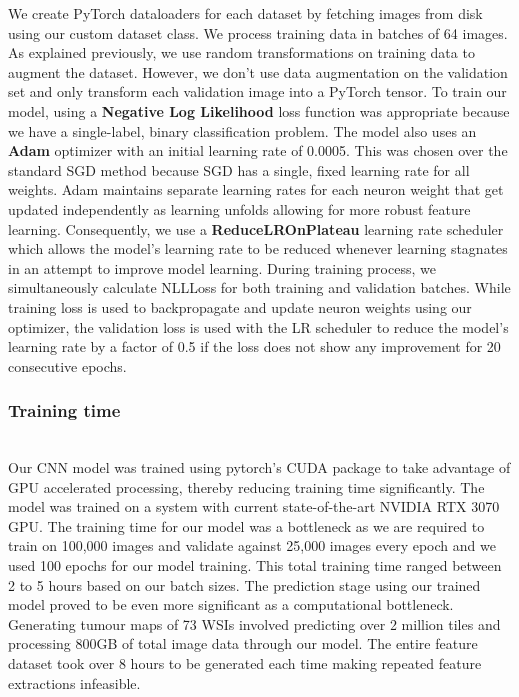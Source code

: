 \documentclass{l4proj}
\begin{document}
We create PyTorch dataloaders for each dataset by fetching images from disk using our custom dataset class. We process training data in batches of 64 images. As explained previously, we use random transformations on training data to augment the dataset. However, we don't use data augmentation on the validation set and only transform each validation image into a PyTorch tensor. To train our model, using a \textbf{Negative Log Likelihood} loss function was appropriate because we have a single-label, binary classification problem. The model also uses an \textbf{Adam} optimizer with an initial learning rate of 0.0005. This was chosen over the standard SGD method because SGD has a single, fixed learning rate for all weights. Adam maintains separate learning rates for each neuron weight that get updated independently as learning unfolds allowing for more robust feature learning. Consequently, we use a \textbf{ReduceLROnPlateau} learning rate scheduler which allows the model's learning rate to be reduced whenever learning stagnates in an attempt to improve model learning. During training process, we simultaneously calculate NLLLoss for both training and validation batches. While training loss is used to backpropagate and update neuron weights using our optimizer, the validation loss is used with the LR scheduler to reduce the model's learning rate by a factor of 0.5 if the loss does not show any improvement for 20 consecutive epochs. 
\\
\subsubsection{Training time}\hfill\\
Our CNN model was trained using pytorch's CUDA package to take advantage of GPU accelerated processing, thereby reducing training time significantly. The model was trained on a system with current state-of-the-art NVIDIA RTX 3070 GPU. The training time for our model was a bottleneck as we are required to train on 100,000 images and validate against 25,000 images every epoch and we used 100 epochs for our model training. This total training time ranged between 2 to 5 hours based on our batch sizes.
The prediction stage using our trained model proved to be even more significant as a computational bottleneck. Generating tumour maps of 73 WSIs involved predicting over 2 million tiles and processing 800GB of total image data through our model. The entire feature dataset took over 8 hours to be generated each time making repeated feature extractions infeasible.
\\
\end{document}
